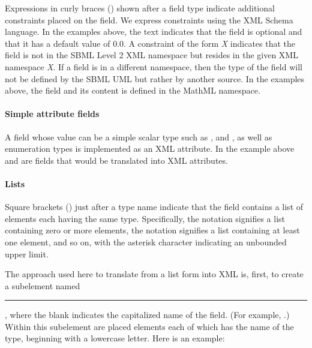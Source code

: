Expressions in curly braces (\token{\{\}}) shown after a field
type indicate additional constraints placed on the field.  We
express constraints using the XML Schema language.  In the
examples above, the text 
indicates that the field  is optional and that it
has a default value of $0.0$.  A constraint of the form
\emph{X} indicates that the
field is not in the SBML Level 2 XML namespace but resides in the
given XML namespace \emph{X}.  If a field is in a different
namespace, then the type of the field will not be defined by the
SBML UML but rather by another source.  In the examples above, the
 field and its content is defined in the MathML
namespace.

\paragraph{Simple attribute fields}

%

A field whose value can be a simple scalar type such as
,  and , as well
as enumeration types is implemented as an XML attribute.  In the
example above  and  are fields that
would be translated into XML attributes.

\paragraph{Lists}

Square brackets (\token{[]}) just after a type name indicate that
the field contains a list of elements each having the same type.
Specifically, the notation \token{[0..*]} signifies a list
containing zero or more elements, the notation \token{[1..*]}
signifies a list containing at least one element, and so on, with
the asterisk character indicating an unbounded upper limit.

The approach used here to translate from a list form into XML is,
first, to create a subelement named
\rule{0.5in}{0.5pt}, where the blank
indicates the capitalized name of the field.  (For example,
.)  Within this subelement are placed elements
each of which has the name of the type, beginning with a lowercase
letter.  Here is an example:

